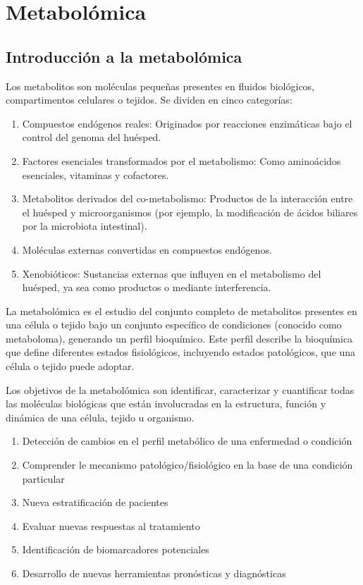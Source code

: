 \chapter{Metabolómica}
\section{Introducción a la metabolómica}
Los metabolitos son moléculas pequeñas presentes en fluidos biológicos, compartimentos celulares o tejidos. Se dividen en cinco categorías:
\begin{enumerate}
\item  Compuestos endógenos reales: Originados por reacciones enzimáticas bajo el control del genoma del huésped.
\item Factores esenciales transformados por el metabolismo: Como aminoácidos esenciales, vitaminas y cofactores.
\item Metabolitos derivados del co-metabolismo: Productos de la interacción entre el huésped y microorganismos (por ejemplo, la modificación de ácidos biliares por la microbiota intestinal).
\item Moléculas externas convertidas en compuestos endógenos.
\item Xenobióticos: Sustancias externas que influyen en el metabolismo del huésped, ya sea como productos o mediante interferencia.
\end{enumerate}

La metabolómica es el estudio del conjunto completo de metabolitos presentes en una célula o tejido bajo un conjunto específico de condiciones (conocido como metaboloma), generando un perfil bioquímico. Este perfil describe la bioquímica que define diferentes estados fisiológicos, incluyendo estados patológicos, que una célula o tejido puede adoptar.

Los objetivos de la metabolómica son identificar, caracterizar y cuantificar todas las moléculas biológicas que están involucradas en la estructura, función y dinámica de una célula, tejido u organismo.
\begin{enumerate}
\item Detección de cambios en el perfil metabólico de una enfermedad o condición
\item Comprender le mecanismo patológico/fisiológico en la base de una condición particular
\item Nueva estratificación de pacientes
\item Evaluar nuevas respuestas al tratamiento
\item Identificación de biomarcadores potenciales
\item Desarrollo de nuevas herramientas pronósticas y diagnósticas
\end{enumerate}

